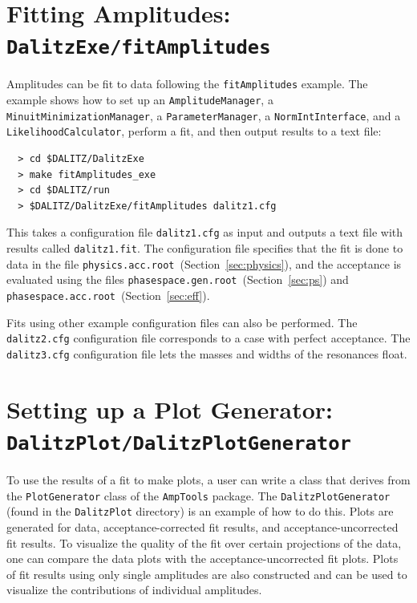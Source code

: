\documentclass[11pt]{article}
\begin{document}
\section{Fitting Amplitudes: \\
{\tt DalitzExe/fitAmplitudes}}
\label{sec:fit}

Amplitudes can be fit to data following the {\tt fitAmplitudes} example.  The example shows how to set up an {\tt AmplitudeManager}, a {\tt MinuitMinimizationManager}, a {\tt ParameterManager}, a {\tt NormIntInterface}, and a {\tt LikelihoodCalculator}, perform a fit, and then output results to a text file:
\begin{verbatim}
  > cd $DALITZ/DalitzExe
  > make fitAmplitudes_exe
  > cd $DALITZ/run
  > $DALITZ/DalitzExe/fitAmplitudes dalitz1.cfg
\end{verbatim}
This takes a configuration file {\tt dalitz1.cfg} as input and outputs a text file with results called {\tt dalitz1.fit}.  The configuration file specifies that the fit is done to data in the file {\tt physics.acc.root}~(Section~\ref{sec:physics}), and the acceptance is evaluated using the files {\tt phasespace.gen.root}~(Section~\ref{sec:ps}) and {\tt phasespace.acc.root}~(Section~\ref{sec:eff}).

Fits using other example configuration files can also be performed.  The {\tt dalitz2.cfg} configuration file corresponds to a case with perfect acceptance.  The {\tt dalitz3.cfg} configuration file lets the masses and widths of the resonances float.

\section{Setting up a Plot Generator: \\
{\tt DalitzPlot/DalitzPlotGenerator}}
\label{sec:dpg}

To use the results of a fit to make plots, a user can write a class that derives from the {\tt PlotGenerator} class of the {\tt AmpTools} package.  The {\tt DalitzPlotGenerator} (found in the {\tt DalitzPlot} directory) is an example of how to do this.  Plots are generated for data, acceptance-corrected fit results, and acceptance-uncorrected fit results.  To visualize the quality of the fit over certain projections of the data, one can compare the data plots with the acceptance-uncorrected fit plots.  Plots of fit results using only single amplitudes are also constructed and can be used to visualize the contributions of individual amplitudes.
\end{document}
